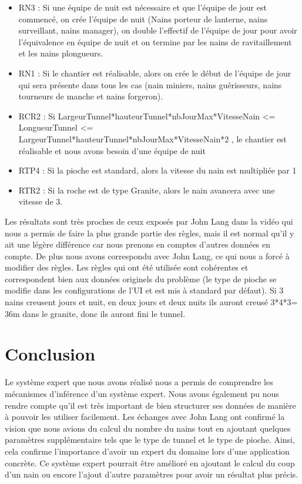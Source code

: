 \documentclass[a4paper,10pt]{report}
\begin{document}
 \begin{itemize}
      \item RN3 : Si une équipe de nuit est nécessaire et que l'équipe de jour est commencé, 
      on crée l'équipe de nuit (Nains porteur de lanterne, nains surveillant, nains manager), 
      on double l'effectif de l'équipe de jour pour avoir l'équivalence en équipe de nuit 
      et on termine par les nains de ravitaillement et les nains plongueurs. 

      \item RN1 : Si le chantier est réalisable, alors on crée le début de l'équipe de jour qui sera présente dans tous les cas 
      (nain miniers, nains guérisseurs, nains tourneurs de manche et nains forgeron).

      \item RCR2 : Si LargeurTunnel*hauteurTunnel*nbJourMax*VitesseNain <= LongueurTunnel <= LargeurTunnel*hauteurTunnel*nbJourMax*VitesseNain*2 , 
	le chantier est réalisable et nous avons besoin d'une équipe de nuit

      \item RTP4 : Si la pioche est standard, alors la vitesse du nain est multipliée par 1

      \item RTR2 : Si la roche est de type Granite, alors le nain avancera avec une vitesse de 3.
\end{itemize}
  Les résultats sont très proches de ceux exposés par John Lang dans la vidéo qui nous a permis de faire la plus grande partie des règles, mais il est normal qu'il
  y ait une légère différence car nous prenons en comptes d'autres données en compte. De plus nous avons correspondu avec John Lang, ce qui nous a forcé à modifier
  des règles. Les règles qui ont été utilisée sont cohérentes et correspondent bien aux données originels du problème (le type de pioche se modifie dans les configurations
  de l'UI et est mis à standard par défaut).
  Si 3 nains creusent jours et nuit, en deux jours et deux nuits ils auront creusé 3*4*3= 36m dans le granite, donc ils auront fini le tunnel.
   
\chapter*{Conclusion}

  Le système expert que nous avons réalisé nous a permis de comprendre les mécanismes d'inférence d'un système expert. Nous avons également pu nous rendre compte
  qu'il est très important de bien structurer ses données de manière à pouvoir les utiliser facilement. Les échanges avec John Lang ont confirmé la vision que nous avions du calcul du nombre du nains tout en ajoutant quelques paramètres supplémentaire tels que le type de tunnel et le type de pioche. Ainsi, cela confirme l'importance d'avoir un expert du domaine lors d'une application concrète.
  Ce système expert pourrait être amélioré en ajoutant 
  le calcul du coup d'un nain ou encore l'ajout d'autre paramètres pour avoir un résultat plus précis.
  
\end{document}
